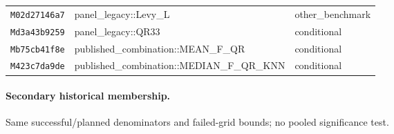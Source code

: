 \begin{longtable}{p{.19\linewidth}p{.58\linewidth}p{.15\linewidth}}
\texttt{M02d27146a7} & panel\_\allowbreak{}legacy::\allowbreak{}Levy\_\allowbreak{}L & other\_\allowbreak{}benchmark \\
\texttt{Md3a43b9259} & panel\_\allowbreak{}legacy::\allowbreak{}QR33 & conditional \\
\texttt{Mb75cb41f8e} & published\_\allowbreak{}combination::\allowbreak{}MEAN\_\allowbreak{}F\_\allowbreak{}QR & conditional \\
\texttt{M423c7da9de} & published\_\allowbreak{}combination::\allowbreak{}MEDIAN\_\allowbreak{}F\_\allowbreak{}QR\_\allowbreak{}KNN & conditional \\
\bottomrule
\end{longtable}

\paragraph{Secondary historical membership.} Same successful/planned denominators and failed-grid bounds; no pooled significance test.
